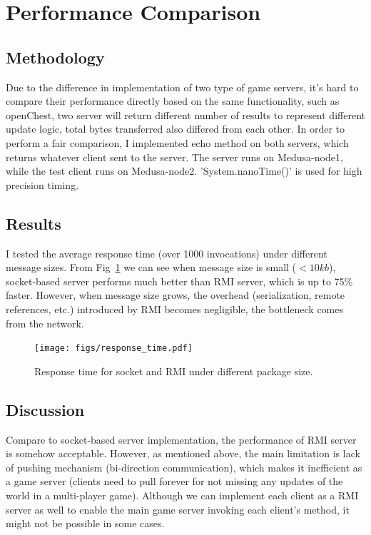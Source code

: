 \documentclass[11pt, oneside]{article}   	%
\begin{document}
\section{Performance Comparison}
\subsection{Methodology} 
Due to the difference in implementation of two type of game servers, it's hard to compare their performance directly based on the same functionality, such as openChest, two server will return different number of results to represent different update logic, total bytes transferred also differed from each other. In order to perform a fair comparison, I implemented echo method on both servers, which returns whatever client sent to the server.
The server runs on Medusa-node1, while the test client runs on Medusa-node2. 'System.nanoTime()' is used for high precision timing.

\subsection{Results}
I tested the average response time (over 1000 invocations) under different message sizes. 
From Fig~\ref{fig:response_time} we can see when message size is small ($<10kb$), socket-based server performs much better than RMI server, which is up to 75\% faster. However, when message size grows, the overhead (serialization, remote references, etc.) introduced by RMI becomes negligible, the bottleneck comes from the network.
\begin{figure}[htbp] %
   \centering
   \texttt{[image: figs/response\_time.pdf]}
   \caption{Response time for socket and RMI under different package size.}
   \label{fig:response_time}
\end{figure} 

\subsection{Discussion}
Compare to socket-based server implementation, the performance of RMI server is somehow acceptable. However, as mentioned above, the main limitation is lack of pushing mechanism (bi-direction communication), which makes it inefficient as a game server (clients need to pull forever for not missing any updates of the world in a multi-player game). Although we can implement each client as a RMI server as well to enable the main game server invoking each client's method, it might not be possible in some cases.
\end{document}
